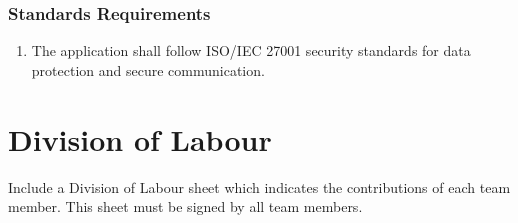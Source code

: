 \documentclass[]{article}
\begin{document}
\subsubsection{Standards Requirements}
\label{ssub:standards_requirements}
\begin{enumerate}[{LR-STD}1. ]
	\item The application shall follow ISO/IEC 27001 security standards for data protection and secure communication.
\end{enumerate}



\appendix
\section{Division of Labour}
\label{sec:division_of_labour}
Include a Division of Labour sheet which indicates the contributions of each team member. This sheet must be signed by all team members.

\end{document}
